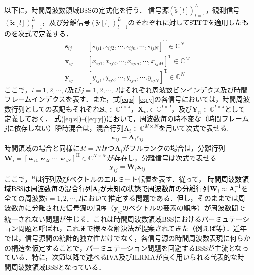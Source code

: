 以下に，時間周波数領域BSSの定式化を行う．
信号源$( \tilde{\bm{s}}[l] )_{l=1}^L$，観測信号$( \tilde{\bm{x}}[l] )_{l=1}^L$，及び分離信号$( \tilde{\bm{y}}[l] )_{l=1}^L$のそれぞれに対して\textcolor{black}{STFTを適用したものを次式で定義する．}
\begin{align}
\bm{s}_{ij} &= [s_{ij1}, s_{ij2}, \cdots, s_{ijn}, \cdots, s_{ijN}]^{\mathrm{T}} \in \mathbb{C}^{N} \label{eq:s} \\
\bm{x}_{ij} &= [x_{ij1}, x_{ij2}, \cdots, x_{ijm}, \cdots, x_{ijM}]^{\mathrm{T}} \in \mathbb{C}^{M} \label{eq:x} \\
\bm{y}_{ij} &= [y_{ij1}, y_{ij2}, \cdots, y_{ijn}, \cdots, y_{ijN}]^{\mathrm{T}} \in \mathbb{C}^{N} \label{eq:y}
\end{align}
ここで，$i=1, 2,  \cdots, I$及び$j=1, 2,  \cdots, J$はそれぞれ周波数ビンインデクス及び時間フレームインデクスを表す．また，式\eqref{eq:s}--\eqref{eq:y}の各信号においては，時間周波数行列としての表記もそれぞれ$\bm{S}_n\in\mathbb{C}^{{I\times J}}$，$\bm{X}_m\in\mathbb{C}^{{I\times J}}$，及び$\bm{Y}_n\in\mathbb{C}^{{I\times J}}$として定義しておく．
\textcolor{black}{式(\ref{eq:s})--(\ref{eq:y})において}，周波数毎の時不変な（時間フレーム$j$に依存しない）瞬時混合は，混合行列$\bm{A}_i \in \mathbb{C}^{M\times N}$を用いて次式で表せる.
\begin{align}
  \bm{x}_{ij} = \bm{A}_i \bm{s}_{ij} \label{eq:xas}
\end{align}
時間領域の場合と同様に$M=N$かつ$\bm{A}_i$がフルランクの場合は，分離行列$\bm{W}_{i} = [\bm{w}_{i1}~\bm{w}_{i2}~\cdots~ ~\bm{w}_{iN}]^{\mathrm{H}} \in \mathbb{C}^{N \times M} $が存在し，分離信号は次式で表せる．
\begin{align}
  \bm{y}_{ij} = \bm{W}_i \bm{x}_{ij} \label{eq:ywj}
\end{align}
ここで，$^{\mathrm{H}}$は行列及びベクトルのエルミート転置を表す．従って，
\textcolor{black}{時間周波数領域BSSは周波数毎の混合行列$\bm{A}_i$が未知の状態で周波数毎の分離行列$\bm{W}_{i} \approx \bm{A}_i^{-1}$}を全ての周波数$i=1, 2, \cdots, I$において推定する問題である．但し，そのままでは周波数毎に分離された信号源の順序（$\bm{y}_{ij}$のベクトルの要素の順序）が周波数間で統一されない問題が生じる．これは時間周波数領域BSSにおけるパーミュテーション問題\cite{permute}と呼ばれ，これまで様々な解決法が提案されてきた（例えば\cite{persolve1,persolve2,persolve3,persolve4}等）．近年では，信号源間の統計的独立性だけでなく，各信号源の時間周波数表現に何らかの構造を仮定することで，パーミュテーション問題を回避するBSSが主流となっている．特に，次節以降で述べるIVA及びILRMAが良く用いられる代表的な時間周波数領域BSSとなっている．


